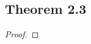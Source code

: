 \documentclass[../../main.tex]{subfiles}
\begin{document}
\subsection{Theorem 2.3}
\begin{wts}

\end{wts}
\begin{proof}

\end{proof}
\end{document}
